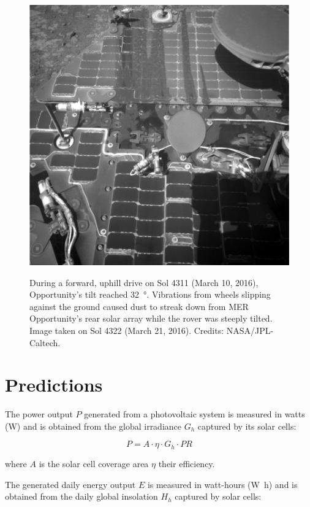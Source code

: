 \begin{figure}[H]
  \centering
  \hypersetup{linkcolor=captionTextColor}
  \includegraphics[width=0.6\linewidth]{sections/power-and-energy-predictions/images/mer-opportunity-dust-streaks.png}\\
  \caption[Streak of dust on MER Opportunity's rear solar array during a steep tilt]
          {During a forward, uphill drive on Sol 4311 (March 10, 2016), Opportunity's tilt reached \SI{32}{\degree}. Vibrations from wheels slipping against the ground caused dust to streak down from MER Opportunity's rear solar array while the rover was steeply tilted. Image taken on Sol 4322 (March 21, 2016). Credits: NASA/JPL-Caltech.}
  \label{fig:image:mer-opportunity-dust-streaks}
\end{figure}

\section{Predictions}
\label{sec:PowerAndEnergyPredictions:Predictions}

The power output $P$ generated from a photovoltaic system is measured in watts (\si{\watt}) and is obtained from the global irradiance $G_{h}$ captured by its solar cells:

\begin{equation}
  \label{eq:SA_power}
  P = A \cdot \eta \cdot G_{h} \cdot PR
\end{equation}

where $A$ is the solar cell coverage area $\eta$ their efficiency.

The generated daily energy output $E$ is measured in watt-hours (\si{\watt\hour}) and is obtained from the daily global insolation $H_{h}$ captured by solar cells:

